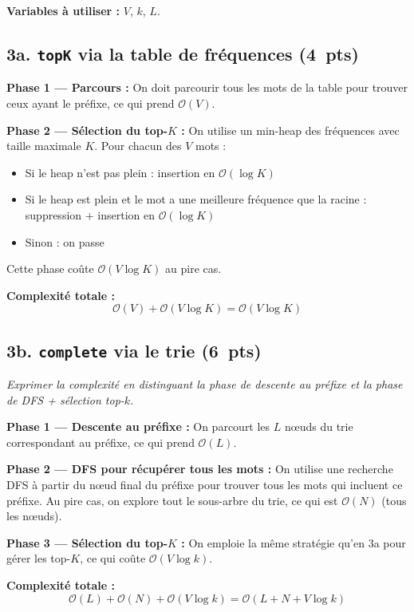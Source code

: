 \documentclass[12pt,a4paper]{article}
\newcommand{\pts}[1]{\hfill\textbf{\small(#1~pts)}}
\newcommand{\answerspace}[1]{\vspace{#1}}
\begin{document}
\textbf{Variables à utiliser :} $V$, $k$, $L$.

\subsection*{3a. \texttt{topK} via la table de fréquences \pts{4}}

\textbf{Phase 1 — Parcours :} On doit parcourir tous les mots de la table pour trouver ceux ayant le préfixe, ce qui prend $\mathcal{O}(V)$.

\textbf{Phase 2 — Sélection du top-$K$ :} On utilise un min-heap des fréquences avec taille maximale $K$. Pour chacun des $V$ mots :
\begin{itemize}
  \item Si le heap n'est pas plein : insertion en $\mathcal{O}(\log K)$
  \item Si le heap est plein et le mot a une meilleure fréquence que la racine : suppression + insertion en $\mathcal{O}(\log K)$
  \item Sinon : on passe
\end{itemize}

Cette phase coûte $\mathcal{O}(V \log K)$ au pire cas.

\textbf{Complexité totale :}
$$\mathcal{O}(V) + \mathcal{O}(V \log K) = \mathcal{O}(V \log K)$$

\answerspace{6em}

\subsection*{3b. \texttt{complete} via le trie \pts{6}}

\textit{Exprimer la complexité en distinguant la phase de descente au préfixe
et la phase de DFS + sélection top-$k$.}

\textbf{Phase 1 — Descente au préfixe :} On parcourt les $L$ nœuds du trie correspondant au préfixe, ce qui prend $\mathcal{O}(L)$.

\textbf{Phase 2 — DFS pour récupérer tous les mots :} On utilise une recherche DFS à partir du nœud final du préfixe pour trouver tous les mots qui incluent ce préfixe. Au pire cas, on explore tout le sous-arbre du trie, ce qui est $\mathcal{O}(N)$ (tous les nœuds).

\textbf{Phase 3 — Sélection du top-$K$ :} On emploie la même stratégie qu'en 3a pour gérer les top-$K$, ce qui coûte $\mathcal{O}(V \log k)$.

\textbf{Complexité totale :}
$$\mathcal{O}(L) + \mathcal{O}(N) + \mathcal{O}(V \log k) = \mathcal{O}(L + N + V \log k)$$
\end{document}
